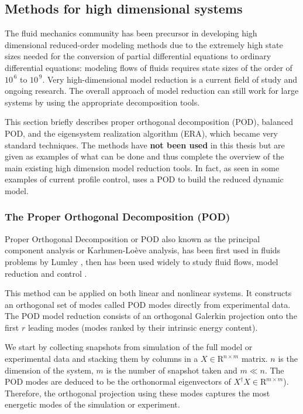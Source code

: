 \documentclass[12pt,lot, lof]{puthesis}
\begin{document}
\subsection{Methods for high dimensional systems}
\label{highdim}

The fluid mechanics community has been precursor in developing high dimensional reduced-order modeling methods due to the extremely high state sizes needed for the conversion of partial differential equations to ordinary differential equations: modeling flows of fluids requires state sizes of the order of $10^{\, 6}$ to $10^{\, 9}$. Very high-dimensional model reduction is a current field of study and ongoing research. The overall approach of model reduction can still work for large systems by using the appropriate decomposition tools.

This section  briefly describes proper orthogonal decomposition (POD), balanced POD, and the eigensystem realization algorithm (ERA), which became very standard techniques. The methods have \textbf{not been used} in this thesis but are given as examples of what can be done and thus complete the overview of the main existing high dimension model reduction tools. In fact, as seen in some examples of current profile control, \cite{Xu11} uses a POD to build the reduced dynamic model.

\subsubsection{The Proper Orthogonal Decomposition (POD)}
Proper Orthogonal Decomposition or POD also known as the principal component analysis or Karhunen-Loève analysis, has been first used in fluids problems by Lumley \cite{Lumley67, Lumley70}, then has been used widely to study fluid flows, model reduction and control \cite{Sirovich87, Aubry88, Holmes96}. 

This method can be applied on both linear and nonlinear systems. It constructs an orthogonal set of modes called POD modes directly from experimental data. The POD model reduction consists of an orthogonal Galerkin projection onto the first $r$ leading modes (modes ranked by their intrinsic energy content). 

We start by collecting snapshots from simulation of the full model or experimental data and stacking them by columns in a $X \in \text{R}^{n \times m}$ matrix. $n$ is the dimension of the system, $m$ is the number of snapshot taken and $m \ll n$.
The POD modes are deduced to be the orthonormal eigenvectors of $X^{\dagger}X \in \text{R}^{m \times m}$). Therefore, the orthogonal projection using these modes captures the most energetic modes of the simulation or experiment.
\end{document}
